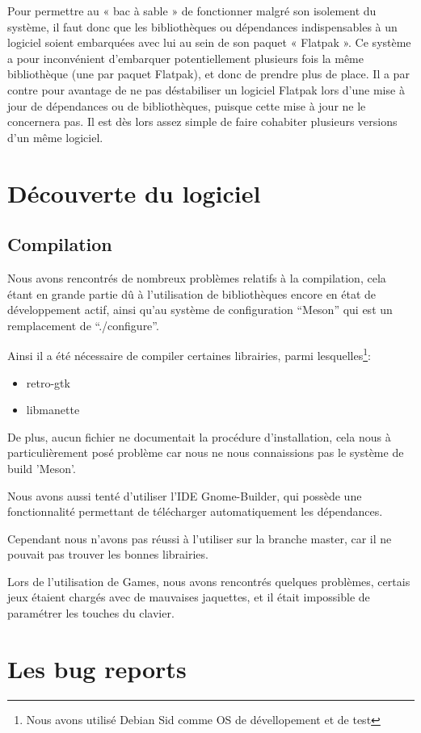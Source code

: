 \documentclass[12pt]{report}
\begin{document}
Pour permettre au « bac à sable » de fonctionner malgré son isolement
du système, il faut donc que les bibliothèques ou dépendances
indispensables à un logiciel soient embarquées avec lui au sein de son
paquet « Flatpak ». Ce système a pour inconvénient d'embarquer
potentiellement plusieurs fois la même bibliothèque (une par paquet
Flatpak), et donc de prendre plus de place. Il a par contre pour
avantage de ne pas déstabiliser un logiciel Flatpak lors d'une mise à
jour de dépendances ou de bibliothèques, puisque cette mise à jour ne
le concernera pas. Il est dès lors assez simple de faire cohabiter
plusieurs versions d'un même logiciel.

\section{Découverte du logiciel}
\subsection{Compilation}
Nous avons rencontrés de nombreux problèmes relatifs à la compilation,
cela étant en grande partie dû à l'utilisation de bibliothèques encore en
état de développement actif, ainsi qu'au système de configuration
``Meson'' qui est un remplacement de ``./configure''.

Ainsi il a été nécessaire de compiler certaines librairies, parmi
lesquelles\footnote{Nous avons utilisé Debian Sid comme OS de dévellopement et de test}:
\begin{itemize}
\item retro-gtk
\item libmanette
\end{itemize}

De plus, aucun fichier ne documentait la procédure d'installation,
cela nous à particulièrement posé problème car nous ne nous
connaissions pas le système de build 'Meson'.

Nous avons aussi tenté d'utiliser l'IDE Gnome-Builder, qui possède une
fonctionnalité permettant de télécharger automatiquement les
dépendances.

Cependant nous n'avons pas réussi à l'utiliser sur la branche master,
car il ne pouvait pas trouver les bonnes librairies.

Lors de l'utilisation de Games, nous avons rencontrés quelques
problèmes, certais jeux étaient chargés avec de mauvaises jaquettes,
et il était impossible de paramétrer les touches du clavier.

\section{Les bug reports}
\end{document}
